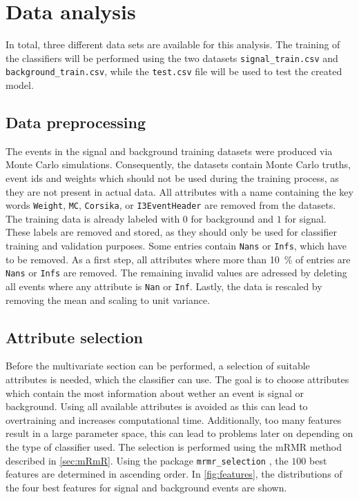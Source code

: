 \section{Data analysis}
\label{sec:Auswertung}

In total, three different data sets are available for this analysis. 
The training of the classifiers will be performed using the two datasets
\texttt{signal\_train.csv} and \texttt{background\_train.csv}, while the
\texttt{test.csv} file will be used to test the created model.

\subsection{Data preprocessing}

The events in the signal and background training datasets were produced via Monte Carlo simulations.
Consequently, the datasets contain Monte Carlo truths, event ids and weights which should not be
used during the training process, as they are not present in actual data.
All attributes with a name containing the key words \texttt{Weight}, \texttt{MC}, \texttt{Corsika}, or
\texttt{I3EventHeader} are removed from the datasets.
The training data is already labeled with $0$ for background and $1$ for signal. These labels are removed and 
stored, as they should only be used for classifier training and validation purposes. Some entries contain \texttt{Nans} or
\texttt{Infs}, which have to be removed. As a first step, all attributes where more than \qty{10}{\percent}
of entries are \texttt{Nans} or \texttt{Infs} are removed. The remaining invalid values are adressed by
deleting all events where any attribute is \texttt{Nan} or \texttt{Inf}.
Lastly, the data is rescaled by removing the mean and scaling to unit variance.

\subsection{Attribute selection}
\label{sec:att_selection}

Before the multivariate section can be performed, a selection of suitable attributes is needed, which the classifier
can use. The goal is to choose attributes which contain the most information about wether an event
is signal or background. Using all available attributes is avoided as this can lead to overtraining and
increases computational time. Additionally, too many features result in a large parameter space, this can lead
to problems later on depending on the type of classifier used.
The selection is performed using the mRMR method described in \autoref{sec:mRmR}. Using the package
\texttt{mrmr\_selection} \cite{mrmr}, the $100$ best features are determined in ascending order.
In \autoref{fig:features}, the distributions of the four best features for signal and background events
are shown.

